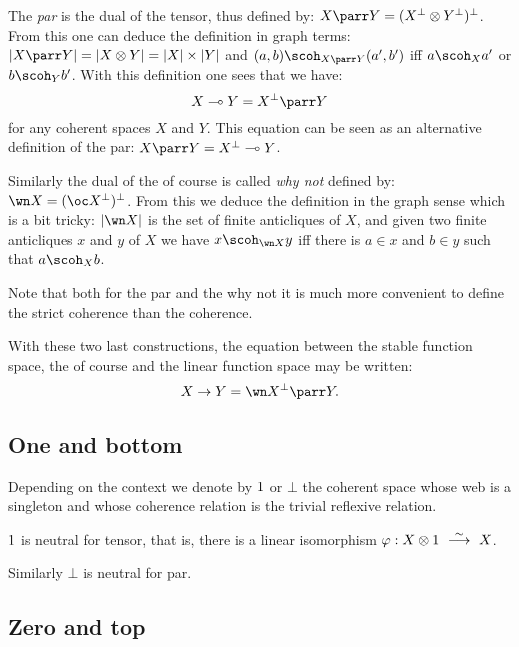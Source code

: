 The \emph{par} is the dual of the tensor, thus defined by:
\(X\parr Y = (X\orth\tens Y\orth)\orth\). From this one can deduce the
definition in graph terms:
\(\web{X\parr Y} = \web{X\tens Y} = \web X\times \web Y\) and
\((a,b)\scoh_{X\parr Y} (a',b')\) iff \(a\scoh_X a'\) or
\(b\scoh_Y b'\). With this definition one sees that we have:
\begin{equation*}
X\limp Y = X\orth\parr Y
\end{equation*}
for any coherent spaces \(X\) and \(Y\). This equation can be seen as an
alternative definition of the par: \(X\parr Y = X\orth\limp Y\).

Similarly the dual of the of course is called \emph{why not} defined by:
\(\wn X = (\oc X\orth)\orth\). From this we deduce the definition in the
graph sense which is a bit tricky: \(\web{\wn X}\) is the set of finite
anticliques of \(X\), and given two finite anticliques \(x\) and \(y\)
of \(X\) we have \(x\scoh_{\wn X} y\) iff there is \(a\in x\) and
\(b\in y\) such that \(a\scoh_X b\).

Note that both for the par and the why not it is much more convenient to
define the strict coherence than the coherence.

With these two last constructions, the equation between the stable
function space, the of course and the linear function space may be
written:
\begin{equation*}
X\imp Y = \wn X\orth\parr Y.
\end{equation*}

\subsection{One and bottom}\label{one-and-bottom}

Depending on the context we denote by \(1\) or \(\bot\) the coherent
space whose web is a singleton and whose coherence relation is the
trivial reflexive relation.

\begin{theorem}
$1$ is neutral for tensor, that is, there is a linear isomorphism $\varphi:X\tens\one\ \stackrel{\sim}{\longrightarrow}\ X$.

Similarly $\bot$ is neutral for par.
\end{theorem}

\subsection{Zero and top}\label{zero-and-top}

